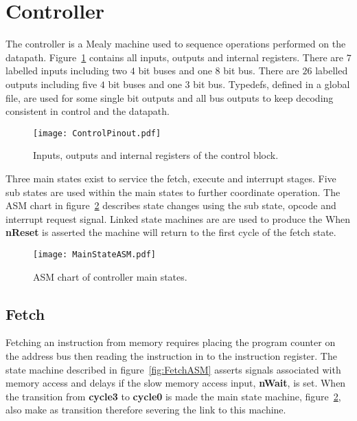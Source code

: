 \section{Controller}

The controller is a Mealy machine used to sequence operations performed on the datapath.
Figure~\ref{fig:ControlBlock} contains all inputs, outputs and internal registers.
There are $7$ labelled inputs including two $4$ bit buses and one $8$ bit bus.
There are $26$ labelled outputs including five $4$ bit buses and one $3$ bit bus.
Typedefs, defined in a global file, are used for some single bit outputs and all bus outputs to keep decoding consistent in control and the datapath. 


\begin{figure}[ht]
   \centering
    \texttt{[image: ControlPinout.pdf]}
		\caption{Inputs, outputs and internal registers of the control block.}%
   \label{fig:ControlBlock}
\end{figure}

Three main states exist to service the fetch, execute and interrupt stages.
Five sub states are used within the main states to further coordinate operation.
The ASM chart in figure~\ref{fig:MainStateASM} describes state changes using the sub state, opcode and interrupt request signal.   
Linked state machines are are used to produce the 
When \textbf{nReset} is asserted the machine will return to the first cycle of the fetch state.




\begin{figure}[ht]
   \centering
    \texttt{[image: MainStateASM.pdf]}
		\caption{ASM chart of controller main states.}
		\label{fig:MainStateASM}
\end{figure}








\subsection{Fetch}

Fetching an instruction from memory requires placing the program counter on the address bus then reading the instruction in to the instruction register. 
The state machine described in figure~\ref{fig:FetchASM} asserts signals associated with memory access and delays if the slow memory access input, \textbf{nWait}, is set.
When the transition from \textbf{cycle3} to \textbf{cycle0} is made the main state machine, figure~\ref{fig:MainStateASM}, also make as transition therefore severing the link to this machine. 

